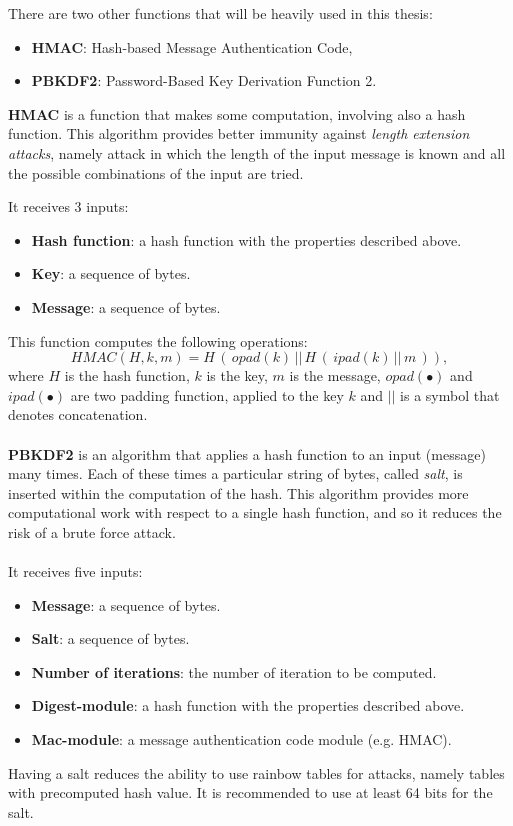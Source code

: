 There are two other functions that will be heavily used in this thesis:
\begin{itemize}
	\item \textbf{HMAC}: Hash-based Message Authentication Code,
	\item \textbf{PBKDF2}: Password-Based Key Derivation Function 2.
\end{itemize}
\begin{flushleft}
	\textbf{HMAC} is a function that makes some computation, involving also a hash function. This algorithm provides better immunity against \textit{length extension attacks}, namely attack in which the length of the input message is known and all the possible combinations of the input are tried.
\end{flushleft}
It receives 3 inputs:
\begin{itemize}[label=$\odot$]
	\item \textbf{Hash function}: a hash function with the properties described above.
	\item \textbf{Key}: a sequence of bytes.
	\item \textbf{Message}: a sequence of bytes.
\end{itemize}
This function computes the following operations:
\begin{equation*}
HMAC(H,k,m)=H\, (\, opad(k) \, ||\, H\, (\, ipad(k) \, ||\,  m \, )),
\end{equation*}
where $H$ is the hash function, $k$ is the key, $m$ is the message, $opad(\bullet)$ and $ipad(\bullet)$ are two padding function, applied to the key $k$ and $||$ is a symbol that denotes concatenation.
\\ \\
\textbf{PBKDF2} is an algorithm that applies a hash function to an input (message) many times. Each of these times a particular string of bytes, called \textit{salt}, is inserted within the computation of the hash. This algorithm provides more computational work with respect to a single hash function, and so it reduces the risk of a brute force attack.
\\ \\
It receives five inputs:
\begin{itemize}[label=$\odot$]
	\item \textbf{Message}: a sequence of bytes.
	\item \textbf{Salt}: a sequence of bytes.
	\item \textbf{Number of iterations}: the number of iteration to be computed.
	\item \textbf{Digest-module}: a hash function with the properties described above.
	\item \textbf{Mac-module}: a message authentication code  module (e.g. HMAC).
\end{itemize}
Having a salt reduces the ability to use rainbow tables for attacks, namely tables with precomputed hash value. It is recommended to use at least 64 bits for the salt.







